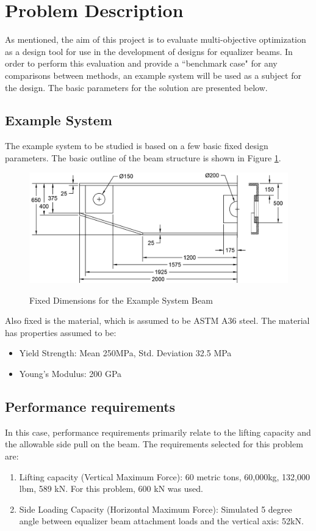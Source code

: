 \section{Problem Description}
As mentioned, the aim of this project is to evaluate multi-objective optimization as a design tool for use in the development of designs for equalizer beams. In order to perform this evaluation and provide a ``benchmark case" for any comparisons between methods, an example system will be used as a subject for the design. The basic parameters for the solution are presented below. 

\subsection{Example System}
\label{sec:beam_des}
The example system to be studied is based on a few basic fixed design parameters. The basic outline of the beam structure is shown in Figure \ref{img:dim_beam}. 

\begin{figure}
\includegraphics[width=\textwidth]{img/dim_beam.png}
	\label{img:dim_beam}
	\caption{Fixed Dimensions for the Example System Beam}
\end{figure}

Also fixed is the material, which is assumed to be ASTM A36 steel. The material has properties assumed to be: 

\begin{itemize}
\item Yield Strength: Mean 250MPa, Std. Deviation 32.5 MPa
\item Young's Modulus: 200 GPa
\end{itemize}

\subsection{Performance requirements}
In this case, performance requirements primarily relate to the lifting capacity and the allowable side pull on the beam. The requirements selected for this problem are: 
\begin{enumerate}
	\item Lifting capacity (Vertical Maximum Force): 60 metric tons, 60,000kg, 132,000 lbm, 589 kN. For this problem, 600 kN was used. 
	\item Side Loading Capacity (Horizontal Maximum Force):  Simulated 5 degree angle between equalizer beam attachment loads and the vertical axis: 52kN. 
\end{enumerate}

